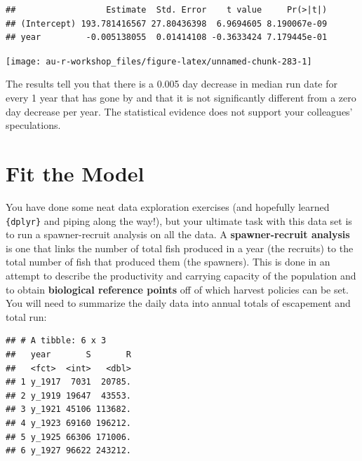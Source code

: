 \documentclass[]{book}
\newenvironment{Shaded}{\begin{snugshade}}{\end{snugshade}}
\newcommand{\KeywordTok}[1]{\textcolor[rgb]{0.13,0.29,0.53}{\textbf{#1}}}
\newcommand{\DataTypeTok}[1]{\textcolor[rgb]{0.13,0.29,0.53}{#1}}
\newcommand{\StringTok}[1]{\textcolor[rgb]{0.31,0.60,0.02}{#1}}
\newcommand{\OperatorTok}[1]{\textcolor[rgb]{0.81,0.36,0.00}{\textbf{#1}}}
\newcommand{\NormalTok}[1]{#1}
\theoremstyle{definition}
\theoremstyle{definition}
\theoremstyle{definition}
\theoremstyle{remark}
\begin{document}
\begin{verbatim}
##                  Estimate  Std. Error    t value     Pr(>|t|)
## (Intercept) 193.781416567 27.80436398  6.9694605 8.190067e-09
## year         -0.005138055  0.01414108 -0.3633424 7.179445e-01
\end{verbatim}

\begin{center}\texttt{[image: au-r-workshop\_files/figure-latex/unnamed-chunk-283-1]} \end{center}

The results tell you that there is a 0.005 day decrease in median run
date for every 1 year that has gone by and that it is not significantly
different from a zero day decrease per year. The statistical evidence
does not support your colleagues' speculations.

\section{Fit the Model}\label{fit-the-model}

You have done some neat data exploration exercises (and hopefully
learned \texttt{\{dplyr\}} and piping along the way!), but your ultimate
task with this data set is to run a spawner-recruit analysis on all the
data. A \textbf{spawner-recruit analysis} is one that links the number
of total fish produced in a year (the recruits) to the total number of
fish that produced them (the spawners). This is done in an attempt to
describe the productivity and carrying capacity of the population and to
obtain \textbf{biological reference points} off of which harvest
policies can be set. You will need to summarize the daily data into
annual totals of escapement and total run:

\begin{Shaded}
\end{Shaded}

\begin{verbatim}
## # A tibble: 6 x 3
##   year       S       R
##   <fct>  <int>   <dbl>
## 1 y_1917  7031  20785.
## 2 y_1919 19647  43553.
## 3 y_1921 45106 113682.
## 4 y_1923 69160 196212.
## 5 y_1925 66306 171006.
## 6 y_1927 96622 243212.
\end{verbatim}
\end{document}
